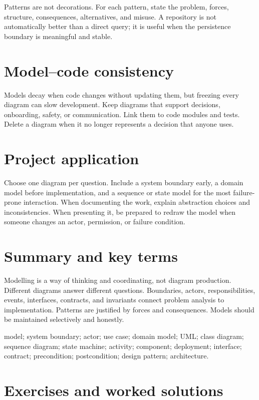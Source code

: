 Patterns are not decorations. For each pattern, state the problem, forces, structure, consequences, alternatives, and misuse. A repository is not automatically better than a direct query; it is useful when the persistence boundary is meaningful and stable.

\section{Model--code consistency}
Models decay when code changes without updating them, but freezing every diagram can slow development. Keep diagrams that support decisions, onboarding, safety, or communication. Link them to code modules and tests. Delete a diagram when it no longer represents a decision that anyone uses.

\section{Project application}
Choose one diagram per question. Include a system boundary early, a domain model before implementation, and a sequence or state model for the most failure-prone interaction. When documenting the work, explain abstraction choices and inconsistencies. When presenting it, be prepared to redraw the model when someone changes an actor, permission, or failure condition.

\section{Summary and key terms}
Modelling is a way of thinking and coordinating, not diagram production. Different diagrams answer different questions. Boundaries, actors, responsibilities, events, interfaces, contracts, and invariants connect problem analysis to implementation. Patterns are justified by forces and consequences. Models should be maintained selectively and honestly.

\begin{keyterms}model; system boundary; actor; use case; domain model; UML; class diagram; sequence diagram; state machine; activity; component; deployment; interface; contract; precondition; postcondition; design pattern; architecture.\end{keyterms}

\section{Exercises and worked solutions}

